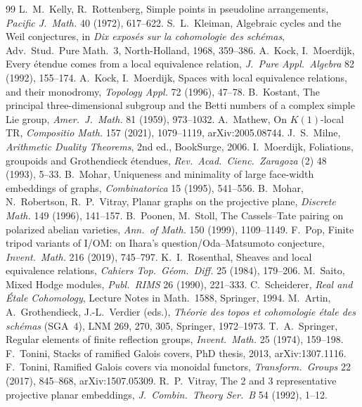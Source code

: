 \documentclass[11pt]{article}
\theoremstyle{definition}
\theoremstyle{plain}\newtheorem*{proposition}{Proposition}\theoremstyle{definition}
\begin{document}
\begin{thebibliography}{99}
 L.~M.~Kelly, R.~Rottenberg, Simple points in pseudoline arrangements, \emph{Pacific J.\ Math.} 40 (1972), 617--622.
 S.~L.~Kleiman, Algebraic cycles and the Weil conjectures, in \emph{Dix exposés sur la cohomologie des schémas}, Adv.\ Stud.\ Pure Math.~3, North-Holland, 1968, 359--386.
 A.~Kock, I.~Moerdijk, Every étendue comes from a local equivalence relation, \emph{J.\ Pure Appl.\ Algebra} 82 (1992), 155--174.
 A.~Kock, I.~Moerdijk, Spaces with local equivalence relations, and their monodromy, \emph{Topology Appl.} 72 (1996), 47--78.
 B.~Kostant, The principal three-dimensional subgroup and the Betti numbers of a complex simple Lie group, \emph{Amer.\ J.\ Math.} 81 (1959), 973--1032.
 A.~Mathew, On $K(1)$-local TR, \emph{Compositio Math.} 157 (2021), 1079--1119, arXiv:2005.08744.
 J.~S.~Milne, \emph{Arithmetic Duality Theorems}, 2nd ed., BookSurge, 2006.
 I.~Moerdijk, Foliations, groupoids and Grothendieck étendues, \emph{Rev.\ Acad.\ Cienc.\ Zaragoza} (2) 48 (1993), 5--33.
 B.~Mohar, Uniqueness and minimality of large face-width embeddings of graphs, \emph{Combinatorica} 15 (1995), 541--556.
 B.~Mohar, N.~Robertson, R.~P.~Vitray, Planar graphs on the projective plane, \emph{Discrete Math.} 149 (1996), 141--157.
 B.~Poonen, M.~Stoll, The Cassels--Tate pairing on polarized abelian varieties, \emph{Ann.\ of Math.} 150 (1999), 1109--1149.
 F.~Pop, Finite tripod variants of I/OM: on Ihara's question/Oda--Matsumoto conjecture, \emph{Invent.\ Math.} 216 (2019), 745--797.
 K.~I.~Rosenthal, Sheaves and local equivalence relations, \emph{Cahiers Top.\ Géom.\ Diff.} 25 (1984), 179--206.
 M.~Saito, Mixed Hodge modules, \emph{Publ.\ RIMS} 26 (1990), 221--333.
 C.~Scheiderer, \emph{Real and Étale Cohomology}, Lecture Notes in Math.~1588, Springer, 1994.
 M.~Artin, A.~Grothendieck, J.-L.~Verdier (eds.), \emph{Théorie des topos et cohomologie étale des schémas} (SGA~4), LNM 269, 270, 305, Springer, 1972--1973.
 T.~A.~Springer, Regular elements of finite reflection groups, \emph{Invent.\ Math.} 25 (1974), 159--198.
 F.~Tonini, Stacks of ramified Galois covers, PhD thesis, 2013, arXiv:1307.1116.
 F.~Tonini, Ramified Galois covers via monoidal functors, \emph{Transform.\ Groups} 22 (2017), 845--868, arXiv:1507.05309.
 R.~P.~Vitray, The 2 and 3 representative projective planar embeddings, \emph{J.\ Combin.\ Theory Ser.\ B} 54 (1992), 1--12.

\end{thebibliography}
\end{document}
